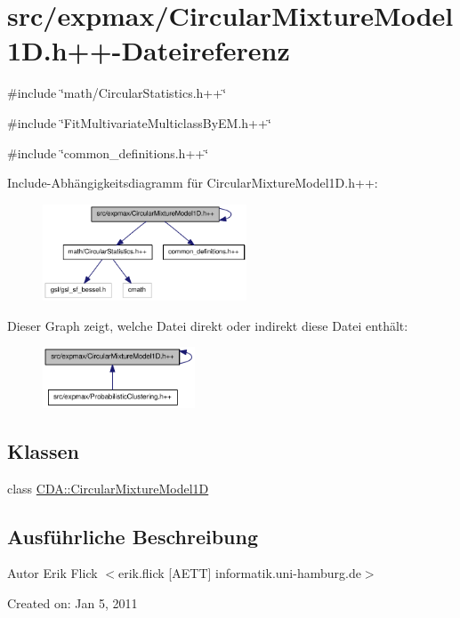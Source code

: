 \hypertarget{CircularMixtureModel1D_8h_09_09}{
\section{src/expmax/CircularMixtureModel1D.h++-\/Dateireferenz}
\label{CircularMixtureModel1D_8h_09_09}
}
{\ttfamily \#include \char`\"{}math/CircularStatistics.h++\char`\"{}}\par
{\ttfamily \#include \char`\"{}FitMultivariateMulticlassByEM.h++\char`\"{}}\par
{\ttfamily \#include \char`\"{}common\_\-definitions.h++\char`\"{}}\par
Include-\/Abhängigkeitsdiagramm für CircularMixtureModel1D.h++:\nopagebreak
\begin{figure}[H]
\begin{center}
\leavevmode
\includegraphics[width=172pt]{CircularMixtureModel1D_8h_09_09__incl}
\end{center}
\end{figure}
Dieser Graph zeigt, welche Datei direkt oder indirekt diese Datei enthält:\nopagebreak
\begin{figure}[H]
\begin{center}
\leavevmode
\includegraphics[width=128pt]{CircularMixtureModel1D_8h_09_09__dep__incl}
\end{center}
\end{figure}
\subsection*{Klassen}
\begin{DoxyCompactItemize}
\item 
class \hyperlink{classCDA_1_1CircularMixtureModel1D}{CDA::CircularMixtureModel1D}
\end{DoxyCompactItemize}


\subsection{Ausführliche Beschreibung}
\begin{DoxyAuthor}{Autor}
Erik Flick $<$erik.flick \mbox{[}AETT\mbox{]} informatik.uni-\/hamburg.de$>$
\end{DoxyAuthor}
Created on: Jan 5, 2011 